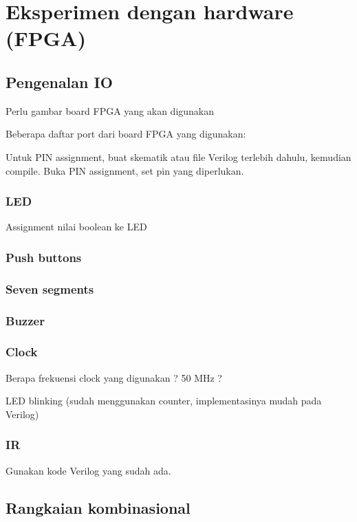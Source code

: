 \section{Eksperimen dengan hardware (FPGA)}

\subsection{Pengenalan IO}

{\color{red} Perlu gambar board FPGA yang akan digunakan}

Beberapa daftar port dari board FPGA yang digunakan:



Untuk PIN assignment, buat skematik atau file Verilog terlebih dahulu, kemudian compile.
Buka PIN assignment, set pin yang diperlukan.


\subsubsection{LED}

Assignment nilai boolean ke LED

\subsubsection{Push buttons}

\subsubsection{Seven segments}

\subsubsection{Buzzer}


\subsubsection{Clock}
{\color{red} Berapa frekuensi clock yang digunakan ? 50 MHz ?}

LED blinking (sudah menggunakan counter, implementasinya
mudah pada Verilog)

\subsubsection{IR}
Gunakan kode Verilog yang sudah ada.


\subsection{Rangkaian kombinasional}

